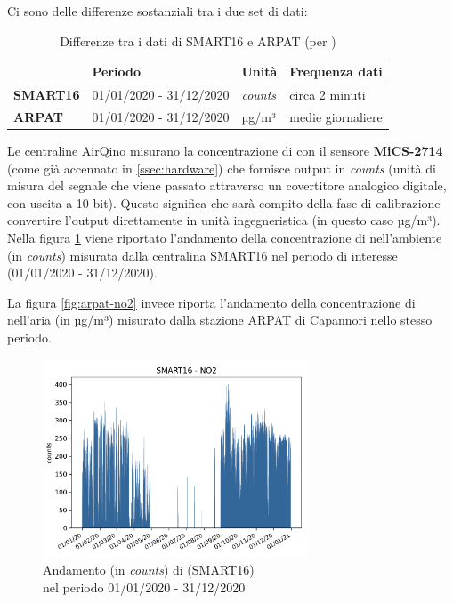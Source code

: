 Ci sono delle differenze sostanziali tra i due set di dati:\\

\begin{table}[H]
\centering
\def\arraystretch{0.9}
\begin{tabular}{|l|l|l|l|}
\cline{2-4}
\multicolumn{1}{c|}{} & \textbf{Periodo} & \textbf{Unità} & \textbf{Frequenza dati} \\ \hline
\textbf{SMART16} & 01/01/2020 - 31/12/2020 & \textit{counts} & circa 2 minuti \\ \hline
\textbf{ARPAT} & 01/01/2020 - 31/12/2020 & µg/m³ & medie giornaliere \\ \hline
\end{tabular}
\captionsetup{justification=centering}
\caption{Differenze tra i dati di SMART16 e ARPAT (per )}
\label{tab:dataset-no2-tabella}
\end{table}

Le centraline AirQino misurano la concentrazione di  con il sensore \textbf{MiCS-2714} (come già accennato in \ref{ssec:hardware}) che fornisce output in \textit{counts} (unità di misura del segnale che viene passato attraverso un covertitore analogico digitale, con uscita a 10 bit). Questo significa che sarà compito della fase di calibrazione convertire l'output direttamente in unità ingegneristica (in questo caso µg/m³).\\

Nella figura \ref{fig:smart16-no2} viene riportato l'andamento della concentrazione di  nell'ambiente (in \textit{counts}) misurata dalla centralina SMART16 nel periodo di interesse (01/01/2020 - 31/12/2020).

La figura \ref{fig:arpat-no2} invece riporta l'andamento della concentrazione di  nell'aria (in µg/m³) misurato dalla stazione ARPAT di Capannori nello stesso periodo.

\clearpage

\begin{figure}[H]
\centering
\captionsetup{justification=centering}
\includegraphics[width=0.70\textwidth,height=\textheight,keepaspectratio]{img/smart16_no2}
\caption{Andamento (in \textit{counts}) di  (SMART16)\\nel periodo 01/01/2020 - 31/12/2020}
\label{fig:smart16-no2}
\end{figure}

